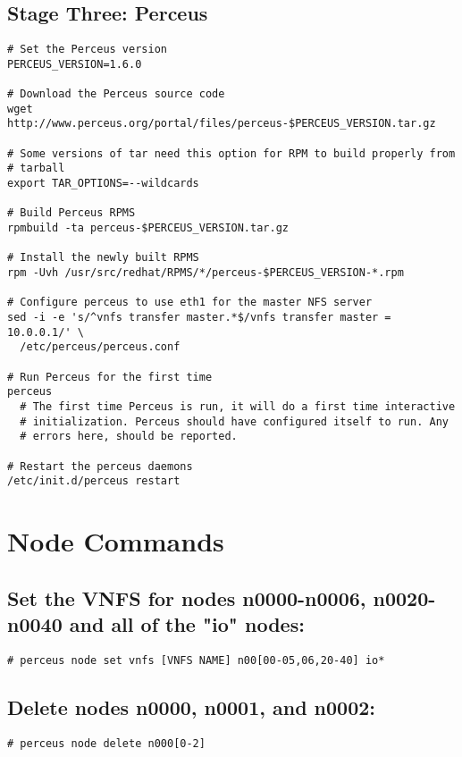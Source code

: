 \documentclass[10pt,letterpaper]{report}
\begin{document}
\subsection{Stage Three: Perceus}

\begin{verbatim}
# Set the Perceus version
PERCEUS_VERSION=1.6.0

# Download the Perceus source code
wget http://www.perceus.org/portal/files/perceus-$PERCEUS_VERSION.tar.gz

# Some versions of tar need this option for RPM to build properly from
# tarball
export TAR_OPTIONS=--wildcards

# Build Perceus RPMS
rpmbuild -ta perceus-$PERCEUS_VERSION.tar.gz

# Install the newly built RPMS
rpm -Uvh /usr/src/redhat/RPMS/*/perceus-$PERCEUS_VERSION-*.rpm

# Configure perceus to use eth1 for the master NFS server
sed -i -e 's/^vnfs transfer master.*$/vnfs transfer master = 10.0.0.1/' \
  /etc/perceus/perceus.conf

# Run Perceus for the first time
perceus
  # The first time Perceus is run, it will do a first time interactive 
  # initialization. Perceus should have configured itself to run. Any
  # errors here, should be reported.

# Restart the perceus daemons
/etc/init.d/perceus restart
\end{verbatim}


\section{Node Commands}

\subsection{Set the VNFS for nodes n0000-n0006, n0020-n0040 and all of the "io" nodes:}

\begin{verbatim}
# perceus node set vnfs [VNFS NAME] n00[00-05,06,20-40] io*
\end{verbatim}

\subsection{Delete nodes n0000, n0001, and n0002:}

\begin{verbatim}
# perceus node delete n000[0-2]
\end{verbatim}
\end{document}
